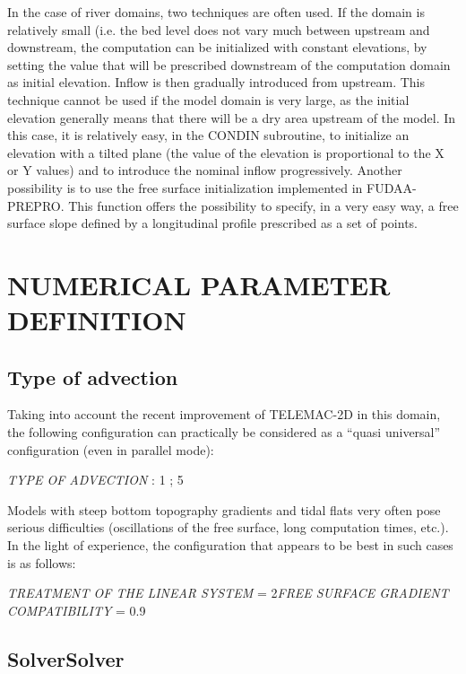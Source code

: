  In the case of river domains, two techniques are often used. If the domain is relatively small (i.e. the bed level does not vary much between upstream and downstream, the computation can be initialized with constant elevations, by setting the value that will be prescribed downstream of the computation domain as initial elevation. Inflow is then gradually introduced from upstream. This technique cannot be used if the model domain is very large, as the initial elevation generally means that there will be a dry area upstream of the model.  In this case, it is relatively easy, in the CONDIN subroutine, to initialize an elevation with a tilted plane (the value of the elevation is proportional to the X or Y values) and to introduce the nominal inflow progressively. Another possibility is to use the free surface initialization implemented in FUDAA-PREPRO. This function offers the possibility to specify, in a very easy way, a free surface slope defined by a longitudinal profile prescribed as a set of points.


\section{ NUMERICAL PARAMETER DEFINITION}


\subsection{ Type of advection}

 Taking into account the recent improvement of TELEMAC-2D in this domain, the following configuration can practically be considered as a ``quasi universal'' configuration (even in parallel mode):

 \textit{TYPE OF ADVECTION} :  1 ; 5

 Models with steep bottom topography gradients and tidal flats very often pose serious difficulties (oscillations of the free surface, long computation times, etc.). In the light of experience, the configuration that appears to be best in such cases is as follows:

 \textit{TREATMENT OF THE LINEAR SYSTEM} = 2\textit{FREE SURFACE GRADIENT COMPATIBILITY} = 0.9


\subsection{ SolverSolver}

